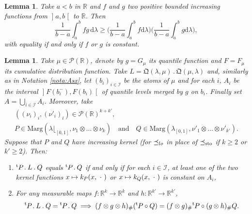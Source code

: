 \documentclass[10pt,a4paper]{article}
\newcommand{\ldot}{\mathbin{.}}
\newcommand\mto{\mathchoice{\longmapsto}{\mapsto}{\mapsto}{\mapsto}}
\theoremstyle{plain}
\newtheorem{lem}[them]{Lemma}
\theoremstyle{definition}
\newcommand{\dd}{\mathrm{d}}
\newcommand{\como}{\mathfrak{Q}}
\newcommand{\trans}{{}^{\mathrm{t}}\mkern-1mu}
\newcommand{\la}{\lambda}
\newcommand{\p}{\mathcal{P}}
\newcommand{\ma}{\mathrm{Marg}}
\newcommand{\R}{\mathbb{R}}
\newcommand{\AND}{\quad\text{and}\quad}
\newcommand{\leqs}{\preceq_{\text{\rm sto}}}
\newcommand{\op}{\mathopen}
\newcommand{\clo}{\mathclose}
\newcommand{\leqlc}{\preceq_{\rm lo}}
\begin{document}
\begin{lem}\label{lem:int_fg}Take $a<b$ in $\R$ and $f$ and $g$ two positive bounded increasing functions from $\op]a,b\clo[$ to $\R$. Then
\[
\frac1{b-a}\int_a^b fg\,\dd\la\geq \biggl(\frac1{b-a}\int_a^b f\dd\la\biggr)\biggl(\frac1{b-a}\int_a^b g\dd\la\biggr),
\]
with equality if and only if $f$ or $g$ is constant.
\end{lem}

\begin{lem}\label{lem:distributivite} Take $\mu\!\in\!\p(\R)$, denote by $g\!=\!G_\mu$ its quantile function and \hbox{$F\!=\!F_\mu$} its cumulative distribution function. Take $L=\como(\la,\mu)\ldot\como(\mu,\la)$ and, similarly as in Nota\-tion \ref{nota:Asx}, let $(b_i)_{i\in{\mathcal{I}}}$ be the atoms of $\mu$ and for each $i$, $A_i$ be the interval $\op]F(b_i^-),F(b_i)\clo[$ of quantile levels merged by $g$ on $b_i$. Finally set $A=\bigcup_{i\in\mathcal{I}}A_i$. Moreover, take\vspace*{-3pt}
\begin{gather*}
((\nu_i)_i,(\nu'_i)_i)\in\p(\R)^{k+k'},\\
P\in \ma(\la\lfloor_{[0,1]},\nu_1\otimes\ldots\otimes\nu_k)\AND Q\in\ma(\la_{[0,1]},\nu'_1\otimes\ldots\otimes\nu'_{k'}).
\end{gather*}
Suppose that $P$ and $Q$ have increasing kernel (for $\leqlc$ in place of $\leqs$ if $k\geq 2$ or $k'\geq2$). Then:
\begin{enumerate}
\item
\label{item:lem:distributiviteA} $\trans P\ldot L\ldot Q$ equals $\trans P\ldot Q$ if and only if for each $i\in{\mathcal I}$, at least one of the two kernel functions $x\mto k_P(x,\ \cdot\ )$ or $x\mto k_Q(x,\ \cdot\ )$ is constant on $A_i$,

\item
\label{item:lem:distributiviteB} For any measurable maps $f:\R^k\to\R^k$ and $h:\R^{k'}\to\R^{k'}$,
\[
\trans P\ldot L\ldot Q=\trans P\ldot Q\implies (f\otimes g \otimes h)_\#(\trans P\circ Q)=(f\otimes g)_\#\trans P\circ (g \otimes h)_\#Q.
\]
\end{enumerate}
\end{lem}
\end{document}
